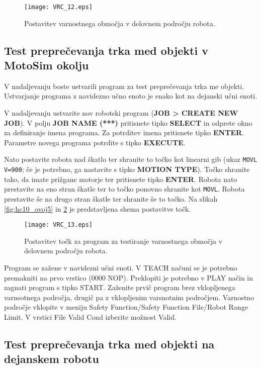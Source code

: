 \begin{figure}[hbt]
	\centering
	\texttt{[image: VRC\_12.eps]}
	\caption{Postavitev varnostnega območja v delovnem področju robota.}
	\label{fig:VRC_12}
\end{figure}


\subsection*{Test preprečevanja trka med objekti v MotoSim okolju}

V nadaljevanju boste ustvarili program za test preprečevanja trka me objekti. Ustvarjanje programa z navidezno učno enoto je enako kot na dejanski učni enoti. 

V nadaljevanju ustvarite nov robotski program (\textbf{JOB > CREATE NEW JOB}). V polju \textbf{JOB NAME (***)} pritisnete tipko \textbf{SELECT} in odprete okno za definiranje imena programa. Za potrditev imena pritisnete tipko \textbf{ENTER}. Parametre novega programa potrdite s tipko \textbf{EXECUTE}.

Nato postavite robota nad škatlo ter shranite to točko kot linearni gib (ukaz \verb"MOVL V=900"; če je potrebno, ga nastavite s tipko \textbf{MOTION TYPE}). Točko shranite tako, da imate prižgane motorje ter pritisnete tipko \textbf{ENTER}. Robota nato prestavite na eno stran škatle ter to točko ponovno shranite kot \verb"MOVL". Robota prestavite še na drugo stran škatle ter shranite še to točko. Na slikah \ref{fig:hc10_ovoj5} in \ref{fig:VRC_13}  je predstavljena shema postavitve točk.

\begin{figure}[hbt]
	\centering
	\texttt{[image: VRC\_13.eps]}
	\caption{Postavitev točk za program za testiranje varnostnega območja v delovnem področju robota.}
	\label{fig:VRC_13}
\end{figure}

Program se zažene v navidezni učni enoti. V TEACH načuni se je potrebno premakniti na prvo vrstico (0000 NOP). Preklopiti je potrebno v PLAY način in zagnati program s tipko START. Zaženite prvič program brez vklopljenega varnsotnega področja, drugič pa z vklopljenim varsnotnim področjem. Varnostno področje vklopite v meniju Safety Function/Safety Function File/Robot Range Limit. V vrstici File Valid Cond izberite možnost Valid.

\subsection*{Test preprečevanja trka med objekti na dejanskem robotu}


